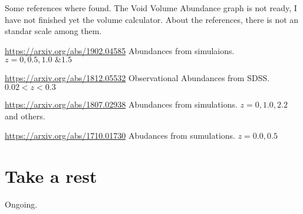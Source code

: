 \documentclass[preprint]{aastex62}
\begin{document}
Some references where found. The Void Volume Abundance graph is not ready, I have not finished yet
the volume calculator. About the references, there is not an standar scale among them.

\href{ArXiv 1902.04585}{https://arxiv.org/abs/1902.04585} Abundances from simulaions. $z = 0, 0.5, 1.0 \text{ \& } 1.5$

\href{ArXiv 1812.05532}{https://arxiv.org/abs/1812.05532} Observational Abundances from SDSS. $0.02<z<0.3$

\href{ArXiv 1807.02938}{https://arxiv.org/abs/1807.02938} Abundances from simulations. $z = 0, 1.0, 2.2$ and others.

\href{Arxiv 1710.01730}{https://arxiv.org/abs/1710.01730} Abudances from sumulations. $z=0.0, 0.5$

\section{Take a rest}

Ongoing.
\end{document}
